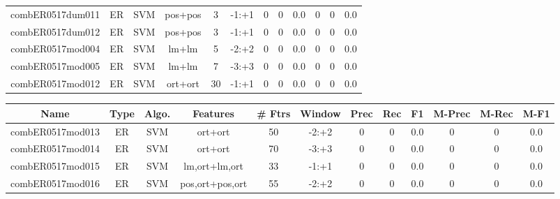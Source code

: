 \documentclass[a4paper]{article}
\begin{document}
\begin{landscape}
\begin{center}
\begin{tabular}{ |c|c|c|c|c|c|c|c|c|c|c|c|}
 
 	
 	\small{ combER0517dum011 } & ER & SVM & pos+pos  &  3 &  -1:+1  &  0 & 0 & 0.0  &  0 & 0 & 0.0 \\
 	

 
 	
 	\small{ combER0517dum012 } & ER & SVM & pos+pos  &  3 &  -1:+1  &  0 & 0 & 0.0  &  0 & 0 & 0.0 \\
 	

 
 	
 	\small{ combER0517mod004 } & ER & SVM & lm+lm  &  5 &  -2:+2  &  0 & 0 & 0.0  &  0 & 0 & 0.0 \\
 	

 
 	
 	\small{ combER0517mod005 } & ER & SVM & lm+lm  &  7 &  -3:+3  &  0 & 0 & 0.0  &  0 & 0 & 0.0 \\
 	

 
 	
 	\small{ combER0517mod012 } & ER & SVM & ort+ort  &  30 &  -1:+1  &  0 & 0 & 0.0  &  0 & 0 & 0.0 \\
 	
 \hline
\end{tabular}
\end{center}




\begin{center}
\begin{tabular}{ |c|c|c|c|c|c|c|c|c|c|c|c|} 
 \hline
 	Name & Type & Algo. & Features & \# Ftrs & Window & Prec & Rec & F1 & M-Prec & M-Rec & M-F1\\
 \hline

 	

 
 	
 	\small{ combER0517mod013 } & ER & SVM & ort+ort  &  50 &  -2:+2  &  0 & 0 & 0.0  &  0 & 0 & 0.0 \\
 	

 
 	
 	\small{ combER0517mod014 } & ER & SVM & ort+ort  &  70 &  -3:+3  &  0 & 0 & 0.0  &  0 & 0 & 0.0 \\
 	

 
 	
 	\small{ combER0517mod015 } & ER & SVM & lm,ort+lm,ort  &  33 &  -1:+1  &  0 & 0 & 0.0  &  0 & 0 & 0.0 \\
 	

 
 	
 	\small{ combER0517mod016 } & ER & SVM & pos,ort+pos,ort  &  55 &  -2:+2  &  0 & 0 & 0.0  &  0 & 0 & 0.0 \\
 	


\end{tabular}
\end{center}
\end{landscape}
\end{document}
